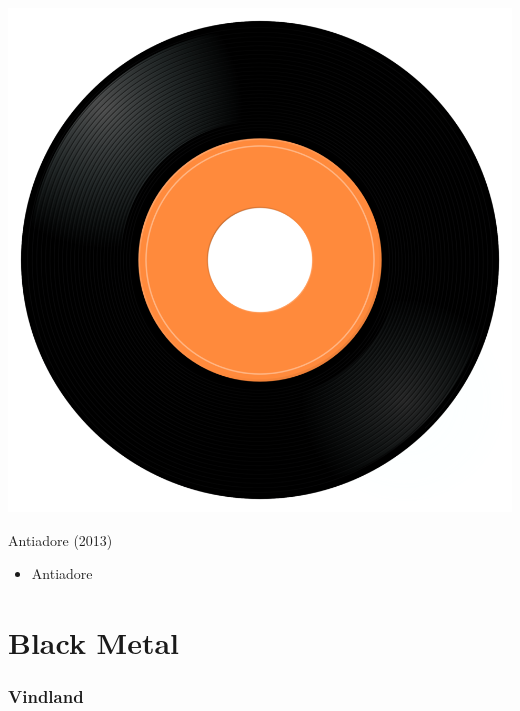 \begin{minipage}[t]{0.25\textwidth}\vspace{0pt}
\captionsetup{type=figure}
\includegraphics[width=\textwidth]{Images/cover.png}
\caption*{Antiadore (2013)}
\end{minipage}
\begin{minipage}[t]{0.25\textwidth}\vspace{0pt}
\begin{itemize}[nosep,leftmargin=1em,labelwidth=*,align=left]
	\setlength{\itemsep}{0pt}
	\item Antiadore
\end{itemize}
\end{minipage}


\section{Black Metal}

\subsubsection{Vindland}

